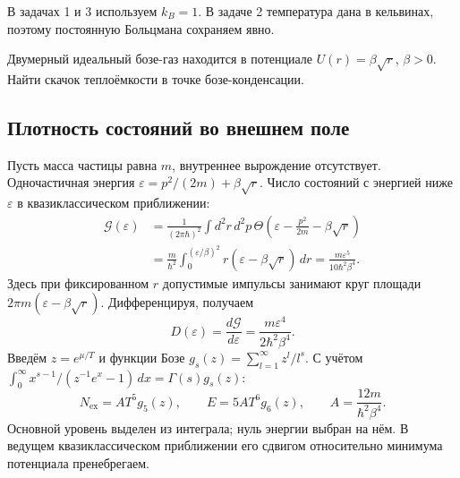 \documentclass[../final.tex]{subfiles}
\begin{document}
В задачах 1 и 3 используем $k_B=1$. В задаче 2 температура дана
в кельвинах, поэтому постоянную Больцмана сохраняем явно.

\condition
Двумерный идеальный бозе-газ находится в потенциале
$U(r)=\beta\sqrt r$, $\beta>0$. Найти скачок теплоёмкости
в точке бозе-конденсации.

\subsection*{Плотность состояний во внешнем поле}
Пусть масса частицы равна $m$, внутреннее вырождение отсутствует.
Одночастичная энергия
$\varepsilon=p^2/(2m)+\beta\sqrt r$.
Число состояний с энергией ниже $\varepsilon$ в квазиклассическом
приближении:
\begin{align*}
 \mathcal G(\varepsilon)
 &=\frac1{(2\pi\hbar)^2}
 \int d^2r\,d^2p\,
 \Theta\left(\varepsilon-\frac{p^2}{2m}-\beta\sqrt r\right)\\
 &=\frac{m}{\hbar^2}
 \int_0^{(\varepsilon/\beta)^2}r(\varepsilon-\beta\sqrt r)\,dr
 =\frac{m\varepsilon^5}{10\hbar^2\beta^4}.
\end{align*}
Здесь при фиксированном $r$ допустимые импульсы занимают круг
площади $2\pi m(\varepsilon-\beta\sqrt r)$.
Дифференцируя, получаем
\[
 D(\varepsilon)=\frac{d\mathcal G}{d\varepsilon}
 =\frac{m\varepsilon^4}{2\hbar^2\beta^4}.
\]
Введём $z=e^{\mu/T}$ и функции Бозе
$g_s(z)=\sum_{l=1}^\infty z^l/l^s$.
С учётом $\int_0^\infty x^{s-1}/(z^{-1}e^x-1)\,dx=\Gamma(s)g_s(z)$:
\[
 N_{\mathrm{ex}}=A T^5g_5(z),\qquad
 E=5A T^6g_6(z),\qquad
 A=\frac{12m}{\hbar^2\beta^4}.
\]
Основной уровень выделен из интеграла; нуль энергии выбран на нём.
В ведущем квазиклассическом приближении его сдвигом относительно
минимума потенциала пренебрегаем.
\end{document}
